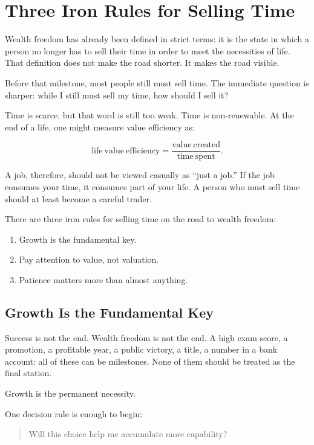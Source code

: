 \chapter{Three Iron Rules for Selling Time}

Wealth freedom has already been defined in strict terms: it is the state in which a person no longer has to sell their time in order to meet the necessities of life. That definition does not make the road shorter. It makes the road visible.

Before that milestone, most people still must sell time. The immediate question is sharper: while I still must sell my time, how should I sell it?

Time is scarce, but that word is still too weak. Time is non-renewable. At the end of a life, one might measure value efficiency as:

\[
\mathrm{life\ value\ efficiency}=\frac{\mathrm{value\ created}}{\mathrm{time\ spent}}.
\]

A job, therefore, should not be viewed casually as ``just a job.'' If the job consumes your time, it consumes part of your life. A person who must sell time should at least become a careful trader.

There are three iron rules for selling time on the road to wealth freedom:

\begin{enumerate}
\item Growth is the fundamental key.
\item Pay attention to value, not valuation.
\item Patience matters more than almost anything.
\end{enumerate}

\section*{Growth Is the Fundamental Key}

Success is not the end. Wealth freedom is not the end. A high exam score, a promotion, a profitable year, a public victory, a title, a number in a bank account: all of these can be milestones. None of them should be treated as the final station.

Growth is the permanent necessity.

One decision rule is enough to begin:

\begin{quote}
Will this choice help me accumulate more capability?
\end{quote}

